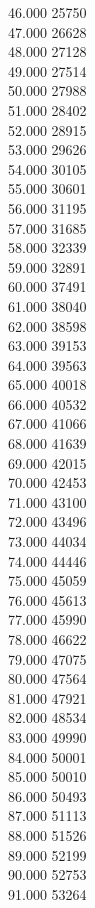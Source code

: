 { 46.000	25750 \\
 47.000	26628 \\
 48.000	27128 \\
 49.000	27514 \\
 50.000	27988 \\
 51.000	28402 \\
 52.000	28915 \\
 53.000	29626 \\
 54.000	30105 \\
 55.000	30601 \\
 56.000	31195 \\
 57.000	31685 \\
 58.000	32339 \\
 59.000	32891 \\
 60.000	37491 \\
 61.000	38040 \\
 62.000	38598 \\
 63.000	39153 \\
 64.000	39563 \\
 65.000	40018 \\
 66.000	40532 \\
 67.000	41066 \\
 68.000	41639 \\
 69.000	42015 \\
 70.000	42453 \\
 71.000	43100 \\
 72.000	43496 \\
 73.000	44034 \\
 74.000	44446 \\
 75.000	45059 \\
 76.000	45613 \\
 77.000	45990 \\
 78.000	46622 \\
 79.000	47075 \\
 80.000	47564 \\
 81.000	47921 \\
 82.000	48534 \\
 83.000	49990 \\
 84.000	50001 \\
 85.000	50010 \\
 86.000	50493 \\
 87.000	51113 \\
 88.000	51526 \\
 89.000	52199 \\
 90.000	52753 \\
 91.000	53264 \\
}
